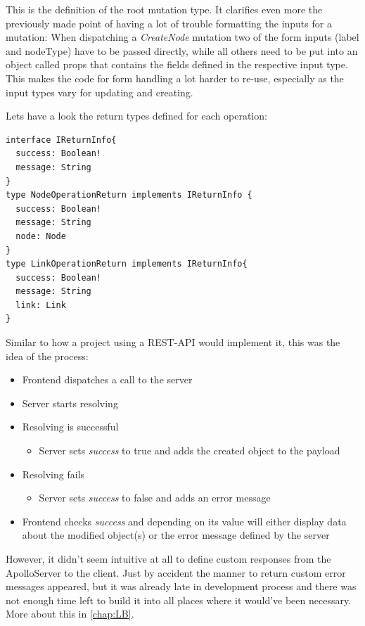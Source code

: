 This is the definition of the root mutation type. It clarifies even more the previously made point of having a lot of trouble formatting the inputs for a mutation: When dispatching a \emph{CreateNode} mutation two of the form inputs (label and nodeType) have to be passed directly, while all others need to be put into an object called props that contains the fields defined in the respective input type. This makes the code for form handling a lot harder to re-use, especially as the input types vary for updating and creating.

\newpage
Lets have a look the return types defined for each operation:
\begin{lstlisting}[caption={Return Types}]
interface IReturnInfo{
  success: Boolean!
  message: String
}
type NodeOperationReturn implements IReturnInfo {
  success: Boolean!
  message: String
  node: Node
}
type LinkOperationReturn implements IReturnInfo{
  success: Boolean!
  message: String
  link: Link
}
\end{lstlisting}
Similar to how a project using a REST-API would implement it, this was the idea of the process:
\begin{itemize}
\item Frontend dispatches a call to the server
\item Server starts resolving
\item Resolving is successful
	\begin{itemize}
		\item Server sets \emph{success} to true and adds the created object to the payload
	\end{itemize}
\item Resolving fails
	\begin{itemize}
		\item Server sets \emph{success} to false and adds an error message
	\end{itemize}

\item Frontend checks \emph{success} and depending on its value will either display data about the modified object(s) or the error message defined by the server
\end{itemize}

However, it didn't seem intuitive at all to define custom responses from the ApolloServer to the client. Just by accident the manner to return custom error messages appeared, but it was already late in development process and there was not enough time left to build it into all places where it would've been necessary. More about this in \autoref{chap:LB}.

